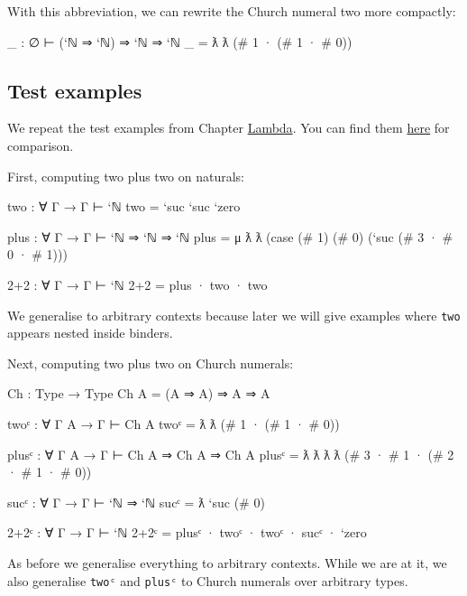 With this abbreviation, we can rewrite the Church numeral two more
compactly:

\begin{fence}
\begin{code}
_ : ∅ ⊢ (`ℕ ⇒ `ℕ) ⇒ `ℕ ⇒ `ℕ
_ = ƛ ƛ (# 1 · (# 1 · # 0))
\end{code}
\end{fence}

\hypertarget{test-examples}{%
\subsection{Test examples}\label{test-examples}}

We repeat the test examples from Chapter
\protect\hyperlink{Lambda}{Lambda}. You can find them
\protect\hyperlink{Lambda-derivation}{here} for comparison.

First, computing two plus two on naturals:

\begin{fence}
\begin{code}
two : ∀ {Γ} → Γ ⊢ `ℕ
two = `suc `suc `zero

plus : ∀ {Γ} → Γ ⊢ `ℕ ⇒ `ℕ ⇒ `ℕ
plus = μ ƛ ƛ (case (# 1) (# 0) (`suc (# 3 · # 0 · # 1)))

2+2 : ∀ {Γ} → Γ ⊢ `ℕ
2+2 = plus · two · two
\end{code}
\end{fence}

We generalise to arbitrary contexts because later we will give examples
where \texttt{two} appears nested inside binders.

Next, computing two plus two on Church numerals:

\begin{fence}
\begin{code}
Ch : Type → Type
Ch A  =  (A ⇒ A) ⇒ A ⇒ A

twoᶜ : ∀ {Γ A} → Γ ⊢ Ch A
twoᶜ = ƛ ƛ (# 1 · (# 1 · # 0))

plusᶜ : ∀ {Γ A} → Γ ⊢ Ch A ⇒ Ch A ⇒ Ch A
plusᶜ = ƛ ƛ ƛ ƛ (# 3 · # 1 · (# 2 · # 1 · # 0))

sucᶜ : ∀ {Γ} → Γ ⊢ `ℕ ⇒ `ℕ
sucᶜ = ƛ `suc (# 0)

2+2ᶜ : ∀ {Γ} → Γ ⊢ `ℕ
2+2ᶜ = plusᶜ · twoᶜ · twoᶜ · sucᶜ · `zero
\end{code}
\end{fence}

As before we generalise everything to arbitrary contexts. While we are
at it, we also generalise \texttt{twoᶜ} and \texttt{plusᶜ} to Church
numerals over arbitrary types.

